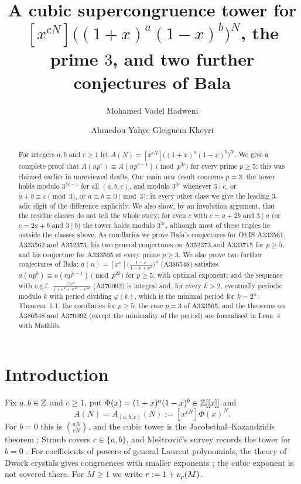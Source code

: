 \documentclass[11pt]{amsart}
\title[{A cubic tower for $[x^{cN}]((1+x)^a(1-x)^b)^N$ and further conjectures of Bala}]{A cubic supercongruence tower for $[x^{cN}]\bigl((1+x)^a(1-x)^b\bigr)^N$, the prime $3$, and two further conjectures of Bala}
\author{Mohamed Vadel Hadweni}
\author{Ahmedou Yahye Gleiguem Kheyri}
\begin{document}
\begin{abstract}
For integers $a,b$ and $c\ge1$ let $A(N)=[x^{cN}]\bigl((1+x)^a(1-x)^b\bigr)^N$. We give a complete proof that $A(np^r)\equiv A(np^{r-1})\pmod{p^{3r}}$ for every prime $p\ge5$; this was claimed earlier in unreviewed drafts. Our main new result concerns $p=3$: the tower holds modulo $3^{3r-1}$ for all $(a,b,c)$, and modulo $3^{3r}$ whenever $3\mid c$, or $a+b\equiv c\pmod3$, or $a\equiv b\equiv0\pmod3$; in every other class we give the leading $3$-adic digit of the difference explicitly. We also show, by an involution argument, that the residue classes do not tell the whole story: for even $c$ with $c=a+2b$ and $3\mid a$ (or $c=2a+b$ and $3\mid b$) the tower holds modulo $3^{3r}$, although most of these triples lie outside the classes above. As corollaries we prove Bala's conjectures for OEIS A333561, A333562 and A352373, his two general conjectures on A352373 and A333715 for $p\ge5$, and his conjecture for A333565 at every prime $p\ge3$. We also prove two further conjectures of Bala: $a(n)=[x^n]\bigl(\frac{1-x}{1-x+x^2}\bigr)^n$ (A386548) satisfies $a(np^k)\equiv a(np^{k-1})\pmod{p^{2k}}$ for $p\ge5$, with optimal exponent; and the sequence with e.g.f.\ $\frac{2e^x}{1+e^x+e^{2x}-e^{3x}}$ (A370092) is integral and, for every $k>2$, eventually periodic modulo $k$ with period dividing $\varphi(k)$, which is the minimal period for $k=2^\alpha$. Theorem~1.1, the corollaries for $p\ge5$, the case $p=3$ of A333565, and the theorems on A386548 and A370092 (except the minimality of the period) are formalised in Lean~4 with Mathlib.
\end{abstract}
\maketitle

\section{Introduction}

Fix $a,b\in\mathbb{Z}$ and $c\ge1$, put $\Phi(x)=(1+x)^a(1-x)^b\in\mathbb{Z}[[x]]$ and
\[ A(N)=A_{(a,b,c)}(N):=[x^{cN}]\Phi(x)^N. \]
For $b=0$ this is $\binom{aN}{cN}$, and the cubic tower is the Jacobsthal--Kazandzidis theorem \cite{jacobsthal1952,kazandzidis1968,robertzuber1995}; Straub \cite[Thm.~3.2]{straub2014} covers $c\in\{a,b\}$, and Me\v{s}trovi\'c's survey records the tower for $b=0$ \cite[eq.~(39)]{mestrovic2011}. For coefficients of powers of general Laurent polynomials, the theory of Dwork crystals gives congruences with smaller exponents \cite{mellitvlasenko2013,bv3}; the cubic exponent is not covered there. For $M\ge1$ we write $r:=1+v_p(M)$.
\end{document}
